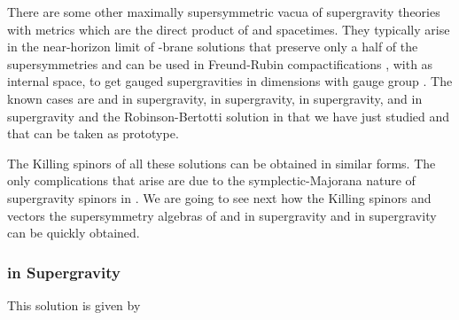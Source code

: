 \documentclass[12pt,a4paper]{article}
\begin{document}
There are some other maximally supersymmetric vacua of supergravity
theories with metrics which are the direct product of \coordHE{} and
\coordHE{} spacetimes. They typically arise in the near-horizon limit of
\coordHE{}-brane solutions that preserve only a half of the supersymmetries
\cite{Gibbons:sv} and can be used in Freund-Rubin compactifications
\cite{Freund:1980xh}, with \coordHE{} as internal space, to get gauged
supergravities in \coordHE{} dimensions with gauge group \coordHE{}. The known
cases are \coordHE{} and \coordHE{}in \coordHE{}
supergravity, \coordHE{} in \coordHE{} supergravity,
\coordHE{} in \coordHE{} supergravity, \coordHE{}
\cite{Chamseddine:1996pi} and \coordHE{}
\cite{Gibbons:1994vm} in \coordHE{} supergravity and the
Robinson-Bertotti solution \coordHE{} in \coordHE{} that we
have just studied and that can be taken as prototype.

The Killing spinors of all these solutions can be obtained in similar
forms. The only complications that arise are due to the
symplectic-Majorana nature of supergravity spinors in \coordHE{}.  We are
going to see next how the Killing spinors and vectors the
supersymmetry algebras of \coordHE{} and \coordHE{}in \coordHE{} supergravity and \coordHE{} in
\coordHE{} supergravity can be quickly obtained.


\subsubsection{\coordHE{} in \coordHE{} Supergravity}

This solution is given by
\end{document}
